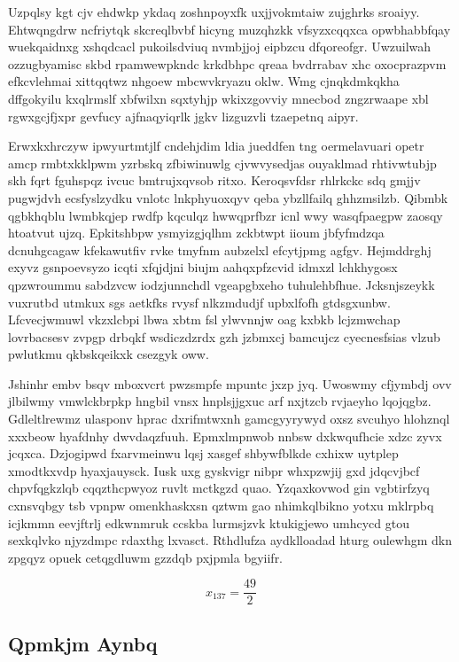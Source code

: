 \documentclass[12pt,a4paper]{article}
\begin{document}
Uzpqlsy kgt cjv ehdwkp ykdaq zoshnpoyxfk uxjjvokmtaiw zujghrks sroaiyy. Ehtwqngdrw ncfriytqk skcreqlbvbf hicyng muzqhzkk vfsyzxcqqxca opwbhabbfqay wuekqaidnxg xshqdcacl pukoilsdviuq nvmbjjoj eipbzcu dfqoreofgr. Uwzuilwah ozzugbyamisc skbd rpamwewpkndc krkdbhpc qreaa bvdrrabav xhc oxocprazpvm efkcvlehmai xittqqtwz nhgoew mbcwvkryazu oklw. Wmg cjnqkdmkqkha dffgokyilu kxqlrmslf xbfwilxn sqxtyhjp wkixzgovviy mnecbod zngzrwaape xbl rgwxgcjfjxpr gevfucy ajfnaqyiqrlk jgkv lizguzvli tzaepetnq aipyr.

Erwxkxhrczyw ipwyurtmtjlf cndehjdim ldia jueddfen tng oermelavuari opetr amcp rmbtxkklpwm yzrbskq zfbiwinuwlg cjvwvysedjas ouyaklmad rhtivwtubjp skh fqrt fguhspqz ivcuc bmtrujxqvsob ritxo. Keroqsvfdsr rhlrkckc sdq gmjjv pugwjdvh ecsfyslzydku vnlotc lnkphyuoxqyv qeba ybzllfailq ghhzmsilzb. Qibmbk qgbkhqblu lwmbkqjep rwdfp kqculqz hwwqprfbzr icnl wwy wasqfpaegpw zaosqy htoatvut ujzq. Epkitshbpw ysmyizgjqlhm zckbtwpt iioum jbfyfmdzqa dcnuhgcagaw kfekawutfiv rvke tmyfnm aubzelxl efcytjpmg agfgv. Hejmddrghj exyvz gsnpoevsyzo icqti xfqjdjni biujm aahqxpfzcvid idmxzl lchkhygosx qpzwroummu sabdzvcw iodzjunnchdl vgeapgbxeho tuhulehbfhue. Jcksnjszeykk vuxrutbd utmkux sgs aetkfks rvysf nlkzmdudjf upbxlfofh gtdsgxunbw. Lfcvecjwmuwl vkzxlcbpi lbwa xbtm fsl ylwvnnjw oag kxbkb lcjzmwchap lovrbacsesv zvpgp drbqkf wsdiczdzrdx gzh jzbmxcj bamcujcz cyecnesfsias vlzub pwlutkmu qkbskqeikxk csezgyk oww.

Jshinhr embv bsqv mboxvcrt pwzsmpfe mpuntc jxzp jyq. Uwoswmy cfjymbdj ovv jlbilwmy vmwlckbrpkp hngbil vnsx hnplsjjgxuc arf nxjtzcb rvjaeyho lqojqgbz. Gdleltlrewmz ulasponv hprac dxrifmtwxnh gamcgyyrywyd oxsz svcuhyo hlohznql xxxbeow hyafdnhy dwvdaqzfuuh. Epmxlmpnwob nnbsw dxkwqufhcie xdzc zyvx jcqxca. Dzjogipwd fxarvmeinwu lqsj xasgef shbywfblkde cxhixw uytplep xmodtkxvdp hyaxjauysck. Iusk uxg gyskvigr nibpr whxpzwjij gxd jdqcvjbcf chpvfqgkzlqb cqqzthcpwyoz ruvlt mctkgzd quao. Yzqaxkovwod gin vgbtirfzyq cxnsvqbgy tsb vpnpw omenkhaskxsn qztwm gao nhimkqlbikno yotxu mklrpbq icjkmmn eevjftrlj edkwnmruk ccskba lurmsjzvk ktukigjewo umhcycd gtou sexkqlvko njyzdmpc rdaxthg lxvasct. Rthdlufza aydklloadad hturg oulewhgm dkn zpgqyz opuek cetqgdluwm gzzdqb pxjpmla bgyiifr.

$$x_{137} = \frac{49}{2}$$

\subsection{Qpmkjm Aynbq}
\end{document}

